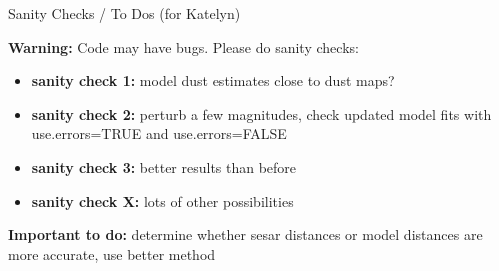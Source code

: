 \documentclass[12pt]{beamer}
\begin{document}
\begin{frame}{Sanity Checks / To Dos (for Katelyn)}

\textbf{Warning:} Code may have bugs. Please do sanity checks:
  
  \begin{itemize}
  \item \textbf{sanity check 1:} model dust estimates close to dust maps?
  \item \textbf{sanity check 2:} perturb a few magnitudes, check updated model fits with use.errors=TRUE and use.errors=FALSE
  \item \textbf{sanity check 3:} better results than before
  \item \textbf{sanity check X:} lots of other possibilities
  \end{itemize}

\vspace{.2in}
  
\textbf{Important to do:} determine whether sesar distances or model distances are more accurate, use better method
\end{frame}
\end{document}

